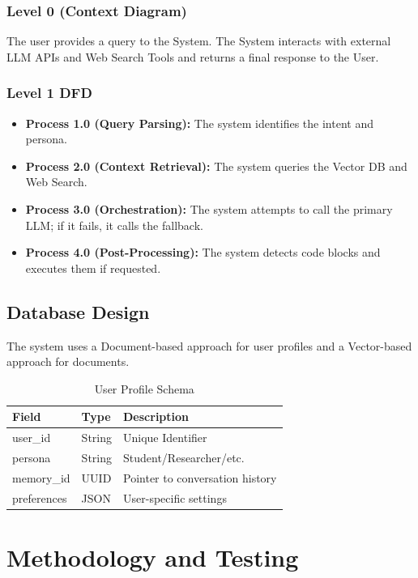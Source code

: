 \documentclass[12pt, a4paper]{report}
\begin{document}
\subsection{Level 0 (Context Diagram)}
The user provides a query to the System. The System interacts with external LLM APIs and Web Search Tools and returns a final response to the User.

\subsection{Level 1 DFD}
\begin{itemize}
    \item \textbf{Process 1.0 (Query Parsing):} The system identifies the intent and persona.
    \item \textbf{Process 2.0 (Context Retrieval):} The system queries the Vector DB and Web Search.
    \item \textbf{Process 3.0 (Orchestration):} The system attempts to call the primary LLM; if it fails, it calls the fallback.
    \item \textbf{Process 4.0 (Post-Processing):} The system detects code blocks and executes them if requested.
\end{itemize}

\section{Database Design}
The system uses a Document-based approach for user profiles and a Vector-based approach for documents.
\begin{table}[h]
    \centering
    \caption{User Profile Schema}
    \begin{tabular}{|l|l|l|}
        \hline
        \textbf{Field} & \textbf{Type} & \textbf{Description} \\ \hline
        user\_id & String & Unique Identifier \\ \hline
        persona & String & Student/Researcher/etc. \\ \hline
        memory\_id & UUID & Pointer to conversation history \\ \hline
        preferences & JSON & User-specific settings \\ \hline
    \end{tabular}
\end{table}

\chapter{Methodology and Testing}
\end{document}
